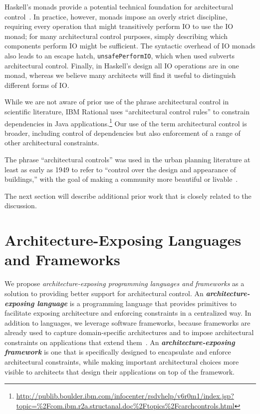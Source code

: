 \documentclass[runningheads]{llncs}
\begin{document}
\begin{sloppypar}
Haskell's monads provide a potential technical foundation for architectural control~\cite{Wadler:1992:EFP:143165.143169}.  In practice, however, monads impose an overly strict discipline, requiring every operation that might transitively perform IO to use the IO monad; for many architectural control purposes, simply describing which components perform IO might be sufficient.  The syntactic overhead of IO monads also leads to an escape hatch, \texttt{unsafePerformIO}, which when used subverts architectural control.  Finally, in Haskell's design all IO operations are in one monad, whereas we believe many architects will find it useful to distinguish different forms of IO.
 
While we are not aware of prior use of the phrase architectural control
in scientific literature, IBM Rational uses ``architectural control rules''
to constrain dependencies in Java applications.\footnote{\url{http://publib.boulder.ibm.com/infocenter/rsdvhelp/v6r0m1/index.jsp?topic=\%2Fcom.ibm.r2a.structanal.doc\%2Ftopics\%2Fcarchcontrols.html}}
Our use of the term architectural control is broader, including control of dependencies but also enforcement of a range of other architectural constraints.

The phrase ``architectural controls'' was used in the urban planning
literature at least as early as 1949 to refer to ``control over the
design and appearance of buildings,'' with the goal of making a
community more beautiful or livable~\cite{arch-controls}.

The next section will describe additional prior work that is closely related to the discussion.

\section{Architecture-Exposing Languages and Frameworks}

We propose \emph{architecture-exposing programming languages and frameworks} as a solution to providing better support for architectural control.  An \emph\textbf{architecture-exposing language} is a programming language that provides primitives to facilitate exposing architecture and enforcing constraints in a centralized way.  In addition to languages, we leverage software frameworks, because frameworks are already used to capture domain-specific architectures and to impose architectural constraints on applications that extend them~\cite{JaspanThesis}.  An \emph\textbf{architecture-exposing framework} is one that is specifically designed to encapsulate and enforce architectural constraints, while making important architectural choices more visible to architects that design their applications on top of the framework.


\end{sloppypar}
\end{document}
